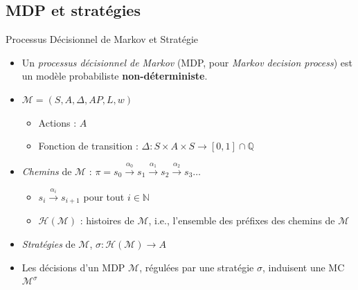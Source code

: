 \documentclass[compress]{beamer}
\begin{document}
\subsection{MDP et stratégies}
\begin{frame}{Processus Décisionnel de Markov et Stratégie}
  \vspace{-0.05\linewidth}
  \begin{itemize}
    \item Un \textit{\color{fibeamer@blue}processus décisionnel de Markov} (MDP, pour \textit{Markov decision process}) est un modèle probabiliste \textbf{\color{fibeamer@orange}non-déterministe}.
    \item $\mathcal{M} = (S, A, \Delta, AP, L, w)$
    \begin{itemize}
      \item Actions : $A$
      \item Fonction de transition : $\Delta : S \times A \times S \rightarrow [0, 1] \cap \mathbb{Q}$
    \end{itemize}
    \item \textit{\color{fibeamer@blue}Chemins} de $\mathcal{M}$ : $\pi = s_0 \xrightarrow{\alpha_0}s_1\xrightarrow{\alpha_1} s_2\xrightarrow{\alpha_2} s_3 \dots$
      \begin{itemize}
        \item $s_i \xrightarrow{\alpha_i} s_{i+1}$%
        pour tout $i \in \mathbb{N}$
        \item $\mathcal{H}(\mathcal{M})$ : histoires de $\mathcal{M}$, i.e., l'ensemble des préfixes des chemins de $\mathcal{M}$
      \end{itemize}
    \item \textit{\color{fibeamer@blue}Stratégies} de $\mathcal{M}$, $\sigma : \mathcal{H}(\mathcal{M}) \rightarrow A$
    \item Les décisions d'un MDP $\mathcal{M}$, régulées par une stratégie
      $\sigma$, induisent une MC $\mathcal{M}^\sigma$
  \end{itemize}
\end{frame}
\end{document}
